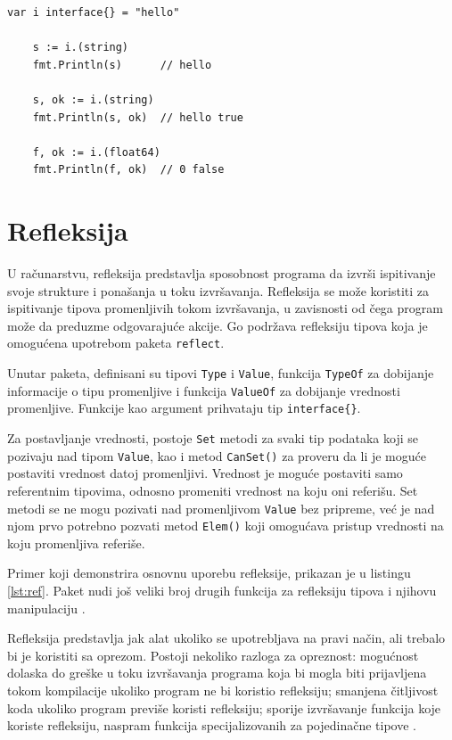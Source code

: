 \documentclass[12pt,oneside]{memoir}
\begin{document}
\begin{center}
\begin{lstlisting}[caption=Primer koji demonstrira pretpostavljanje tipova kod interfejsa, label={lst:type},  backgroundcolor=\color{background}]
	var i interface{} = "hello"

	s := i.(string)
	fmt.Println(s) 		// hello

	s, ok := i.(string)
	fmt.Println(s, ok) 	// hello true

	f, ok := i.(float64)
	fmt.Println(f, ok) 	// 0 false
\end{lstlisting}
\end{center}


\section{Refleksija}

U računarstvu, refleksija predstavlja sposobnost programa da izvrši ispitivanje svoje strukture i ponašanja u toku izvršavanja. Refleksija se može koristiti za ispitivanje tipova promenljivih tokom izvršavanja, u zavisnosti od čega program može da preduzme odgovarajuće akcije. Go podržava refleksiju tipova koja je omogućena upotrebom paketa \texttt{reflect}.

Unutar paketa, definisani su tipovi \texttt{Type} i \texttt{Value}, funkcija \texttt{TypeOf} za dobijanje informacije o tipu promenljive i funkcija \texttt{ValueOf} za dobijanje vrednosti promenljive. Funkcije kao argument prihvataju tip \texttt{interface\{\}}. 

Za postavljanje vrednosti, postoje \texttt{Set} metodi za svaki tip podataka koji se pozivaju nad tipom \texttt{Value}, kao i metod \texttt{CanSet()} za proveru da li je moguće postaviti vrednost datoj promenljivi. Vrednost je moguće postaviti samo referentnim tipovima, odnosno promeniti vrednost na koju oni referišu. Set metodi se ne mogu pozivati nad promenljivom \texttt{Value} bez pripreme, već je nad njom prvo potrebno pozvati metod \texttt{Elem()} koji omogućava pristup vrednosti na koju promenljiva referiše.  

Primer koji demonstrira osnovnu uporebu refleksije, prikazan je u listingu \ref{lst:ref}. Paket nudi još veliki broj drugih funkcija za refleksiju tipova i njihovu manipulaciju \cite{reflect}.

Refleksija predstavlja jak alat ukoliko se upotrebljava na pravi način, ali trebalo bi je koristiti sa oprezom. Postoji nekoliko razloga za opreznost: mogućnost dolaska do greške u toku izvršavanja programa koja bi mogla biti prijavljena tokom kompilacije ukoliko program ne bi koristio refleksiju; smanjena čitljivost koda ukoliko program previše koristi refleksiju; sporije izvršavanje funkcija koje koriste refleksiju, naspram funkcija specijalizovanih za pojedinačne tipove \cite{bookGoProg}.
\end{document}
